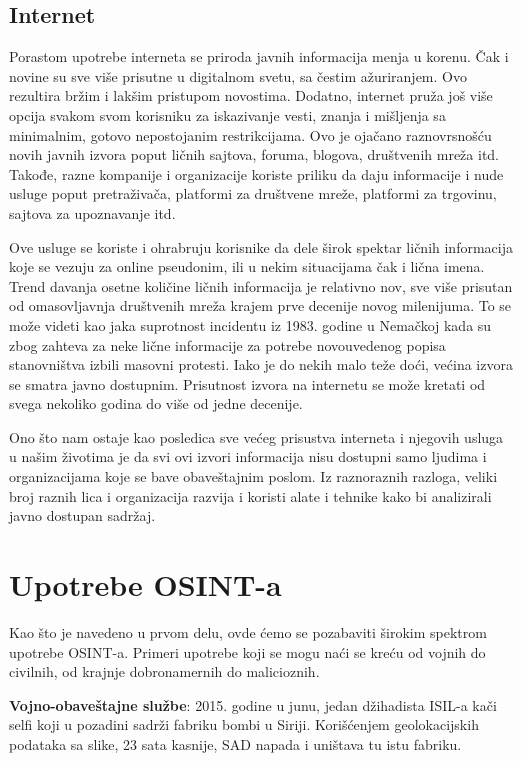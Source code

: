 \documentclass[fleqn, 12pt]{article}
\begin{document}
\subsection{Internet}
Porastom upotrebe interneta se priroda javnih informacija menja u korenu. Čak i novine su sve više prisutne u digitalnom svetu, sa čestim ažuriranjem. Ovo rezultira bržim i lakšim pristupom novostima. Dodatno, internet pruža još više opcija svakom svom korisniku za iskazivanje vesti, znanja i mišljenja sa minimalnim, gotovo nepostojanim restrikcijama. Ovo je ojačano raznovrsnošću novih javnih izvora poput ličnih sajtova, foruma, blogova, društvenih mreža itd. Takođe, razne kompanije i organizacije koriste priliku da daju informacije i nude usluge poput pretraživača, platformi za društvene mreže, platformi za trgovinu, sajtova za upoznavanje itd.\newline

Ove usluge se koriste i ohrabruju korisnike da dele širok spektar ličnih informacija koje se vezuju za online pseudonim, ili u nekim situacijama čak i lična imena. Trend davanja osetne količine ličnih informacija je relativno nov, sve više prisutan od omasovljavnja društvenih mreža krajem prve decenije novog milenijuma.  To se može videti kao jaka suprotnost incidentu iz 1983. godine u Nemačkoj kada su zbog zahteva za neke lične informacije za potrebe novouvedenog popisa stanovništva izbili masovni protesti.
Iako je do nekih malo teže doći, većina izvora se smatra javno dostupnim. Prisutnost izvora na internetu se može kretati od svega nekoliko godina do više od jedne decenije.\newline

Ono što nam ostaje kao posledica sve većeg prisustva interneta i njegovih usluga u našim životima je da svi ovi izvori informacija nisu dostupni samo ljudima i organizacijama koje se bave obaveštajnim poslom. Iz raznoraznih razloga, veliki broj raznih lica i organizacija razvija i koristi alate i tehnike kako bi analizirali javno dostupan sadržaj.
\newpage
\section{Upotrebe OSINT-a}
Kao što je navedeno u prvom delu, ovde ćemo se pozabaviti širokim spektrom upotrebe OSINT-a. Primeri upotrebe koji se mogu naći se kreću od vojnih do civilnih, od krajnje dobronamernih do malicioznih.\newline

\textbf{Vojno-obaveštajne službe}: 2015. godine u junu, jedan džihadista ISIL-a kači selfi koji u pozadini sadrži fabriku bombi u Siriji. Korišćenjem geolokacijskih podataka sa slike, 23 sata kasnije, SAD napada i uništava tu istu fabriku.\newline
\end{document}
